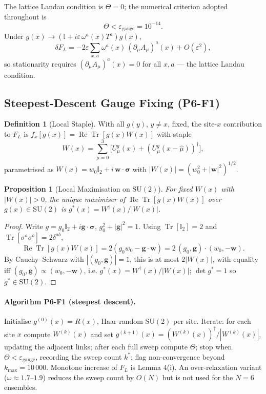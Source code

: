\documentclass[11pt,a4paper]{article}
\theoremstyle{plain}
\newtheorem{proposition}{Proposition}
\theoremstyle{definition}
\newtheorem{definition}{Definition}
\theoremstyle{remark}
\newcommand{\SU}{\mathrm{SU}}
\newcommand{\Tr}{\operatorname{Tr}}
\renewcommand{\Re}{\operatorname{Re}}
\newcommand{\epsg}{\varepsilon_{\mathrm{gauge}}}
\newcommand{\FL}{F_{L}}
\newcommand{\Id}{\mathbb{I}}
\newcommand{\Lcond}{\partial_{\mu}A_{\mu}}
\begin{document}
The lattice Landau condition is $\Theta=0$; the numerical criterion
adopted throughout is
\begin{equation}
  \Theta<\epsg=10^{-14}.
  \label{eq:epsgauge}
\end{equation}
Under $g(x)\to(\Id+i\varepsilon\,\omega^{a}(x)T^{a})g(x)$,
\begin{equation}
  \delta\FL=-2\varepsilon\sum_{x,a}\omega^{a}(x)\,(\Lcond)^{a}(x)
  +O(\varepsilon^{2}),
  \label{eq:firstvar}
\end{equation}
so stationarity requires $(\Lcond)^{a}(x)=0$ for all $x,a$ --- the
lattice Landau condition.

\subsection{Steepest-Descent Gauge Fixing (P6-F1)}
\label{ssec:SD}

\begin{definition}[Local Staple]
With all $g(y)$, $y\ne x$, fixed, the site-$x$ contribution to $\FL$ is
$f_x[g(x)]=\Re\Tr[g(x)W(x)]$ with staple
\begin{equation}
  W(x)=\sum_{\mu=0}^{3}\bigl[U^{g}_{\mu}(x)+(U^{g}_{\mu}(x-\hat\mu))^{\dagger}\bigr],
  \label{eq:staple}
\end{equation}
parametrised as $W(x)=w_0\Id_2+i\,\bm{w}\cdot\bm{\sigma}$ with
$|W(x)|=(w_0^2+|\bm{w}|^2)^{1/2}$.
\end{definition}

\begin{proposition}[Local Maximisation on $\SU(2)$]
For fixed $W(x)$ with $|W(x)|>0$, the unique maximiser of
$\Re\Tr[g(x)W(x)]$ over $g(x)\in\SU(2)$ is
$g^{*}(x)=W^{\dagger}(x)/|W(x)|$.
\end{proposition}

\begin{proof}
Write $g=g_0\Id_2+i\bm{g}\cdot\bm{\sigma}$, $g_0^2+|\bm{g}|^2=1$. Using
$\Tr[\Id_2]=2$ and $\Tr[\sigma^a\sigma^b]=2\delta^{ab}$,
\[
  \Re\Tr[g(x)W(x)]=2(g_0w_0-\bm{g}\cdot\bm{w})
  =2\,(g_0,\bm{g})\cdot(w_0,-\bm{w}).
\]
By Cauchy--Schwarz with $|(g_0,\bm{g})|=1$, this is at most $2|W(x)|$,
with equality iff $(g_0,\bm{g})\propto(w_0,-\bm{w})$, i.e.
$g^{*}(x)=W^{\dagger}(x)/|W(x)|$; $\det g^*=1$ so $g^*\in\SU(2)$.
\end{proof}

\paragraph{Algorithm P6-F1 (steepest descent).}
Initialise $g^{(0)}(x)=R(x)$, Haar-random $\SU(2)$ per site. Iterate:
for each site $x$ compute $W^{(k)}(x)$ and set
$g^{(k+1)}(x)=(W^{(k)}(x))^{\dagger}/|W^{(k)}(x)|$, updating the
adjacent links; after each full sweep compute $\Theta$; stop when
$\Theta<\epsg$, recording the sweep count $k^{*}$; flag non-convergence
beyond $k_{\max}=10\,000$. Monotone increase of $\FL$ is Lemma 4(i). An
over-relaxation variant ($\omega\approx1.7$--$1.9$) reduces the sweep
count by $O(N)$ but is not used for the $N=6$ ensembles.
\end{document}

